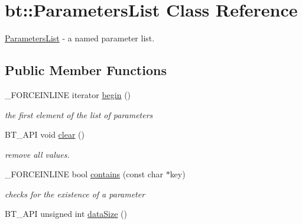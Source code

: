 \hypertarget{classbt_1_1_parameters_list}{\section{bt\-:\-:Parameters\-List Class Reference}
\label{classbt_1_1_parameters_list}
}


\hyperlink{classbt_1_1_parameters_list}{Parameters\-List} -\/ a named parameter list.  


\subsection*{Public Member Functions}
\begin{DoxyCompactItemize}
\item 
\hypertarget{classbt_1_1_parameters_list_a65469ffa3de3994ee910feefc178c286}{\-\_\-\-F\-O\-R\-C\-E\-I\-N\-L\-I\-N\-E iterator \hyperlink{classbt_1_1_parameters_list_a65469ffa3de3994ee910feefc178c286}{begin} ()}\label{classbt_1_1_parameters_list_a65469ffa3de3994ee910feefc178c286}

\begin{DoxyCompactList}\small\item\em the first element of the list of parameters \end{DoxyCompactList}\item 
\hypertarget{classbt_1_1_parameters_list_a0e99f0b435e76e2eae7fa0a2b3d59b81}{B\-T\-\_\-\-A\-P\-I void \hyperlink{classbt_1_1_parameters_list_a0e99f0b435e76e2eae7fa0a2b3d59b81}{clear} ()}\label{classbt_1_1_parameters_list_a0e99f0b435e76e2eae7fa0a2b3d59b81}

\begin{DoxyCompactList}\small\item\em remove all values. \end{DoxyCompactList}\item 
\hypertarget{classbt_1_1_parameters_list_a2aa9b41bcae9582611fdd88a94ebf255}{\-\_\-\-F\-O\-R\-C\-E\-I\-N\-L\-I\-N\-E bool \hyperlink{classbt_1_1_parameters_list_a2aa9b41bcae9582611fdd88a94ebf255}{contains} (const char $\ast$key)}\label{classbt_1_1_parameters_list_a2aa9b41bcae9582611fdd88a94ebf255}

\begin{DoxyCompactList}\small\item\em checks for the existence of a parameter \end{DoxyCompactList}\item 
\hypertarget{classbt_1_1_parameters_list_aef8e30fdac635c7abd34120c1c8607e2}{B\-T\-\_\-\-A\-P\-I unsigned int \hyperlink{classbt_1_1_parameters_list_aef8e30fdac635c7abd34120c1c8607e2}{data\-Size} ()}\label{classbt_1_1_parameters_list_aef8e30fdac635c7abd34120c1c8607e2}


\end{DoxyCompactItemize}
